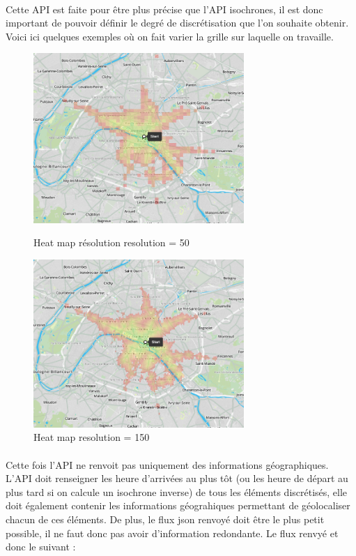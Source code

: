 \documentclass[a4paper]{report}
\begin{document}
\paragraph{} Cette API est faite pour être plus précise que l'API isochrones, il est donc important de pouvoir définir le degré de discrétisation que l'on souhaite obtenir. Voici ici quelques exemples où on fait varier la grille sur laquelle on travaille.

\begin{figure}[H]
	\begin{minipage}[c]{.46\linewidth}
		\includegraphics[width=8cm]{image/heatmap_basse_reso}
       		\caption{Heat map résolution resolution = 50}
		\label{Heat map resolution = 50}
	\end{minipage} \hfill
	\begin{minipage}[c]{.46\linewidth}
		\includegraphics[width=8cm]{image/heatmap_haute_reso}
       		\caption{Heat map resolution = 150}
		\label{Heat map resolution = 150}
	\end{minipage}
\end{figure}

\paragraph{}Cette fois l'API ne renvoit pas uniquement des informations géographiques. L'API doit renseigner les heure d'arrivées au plus tôt (ou les heure de départ au plus tard si on calcule un isochrone inverse) de tous les éléments discrétisés, elle doit également contenir les informations géograhiques permettant de géolocaliser chacun de ces éléments. De plus, le flux json renvoyé doit être le plus petit possible, il ne faut donc pas avoir d'information redondante. Le flux renvyé et donc le suivant :
\end{document}
